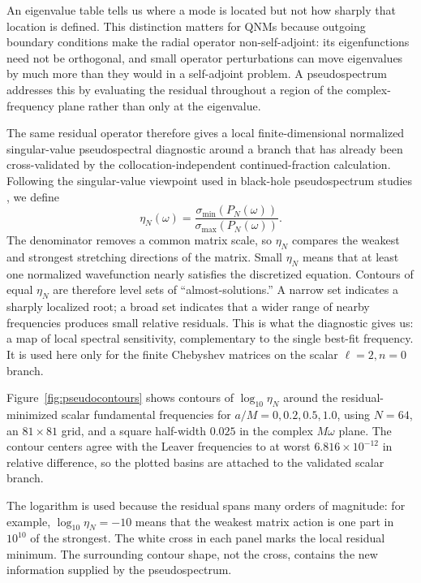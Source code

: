 \documentclass[12pt,a4paper]{article}
\begin{document}
\color{blue}
An eigenvalue table tells us where a mode is located but not how sharply that
location is defined.  This distinction matters for QNMs because outgoing
boundary conditions make the radial operator non-self-adjoint: its
eigenfunctions need not be orthogonal, and small operator perturbations can
move eigenvalues by much more than they would in a self-adjoint problem.  A
pseudospectrum addresses this by evaluating the residual throughout a region
of the complex-frequency plane rather than only at the eigenvalue.

The same residual operator therefore gives a local finite-dimensional
normalized singular-value pseudospectral diagnostic around a branch that has
already been cross-validated by the collocation-independent continued-fraction
calculation.  Following the
singular-value viewpoint used in black-hole pseudospectrum studies
\cite{Jaramillo2021,Cao2024}, we define
\color{black}
\begin{equation}
\eta_N(\omega)=\frac{\sigma_{\min}(P_N(\omega))}{\sigma_{\max}(P_N(\omega))}.
\end{equation}
\color{blue}
The denominator removes a common matrix scale, so \(\eta_N\) compares the
weakest and strongest stretching directions of the matrix.  Small
\(\eta_N\) means that at least one normalized wavefunction nearly satisfies
the discretized equation.  Contours of equal \(\eta_N\) are therefore level
sets of ``almost-solutions.''  A narrow set indicates a sharply localized
root; a broad set indicates that a wider range of nearby frequencies produces
small relative residuals.  This is what the diagnostic gives us: a map of
local spectral sensitivity, complementary to the single best-fit frequency.
It is used here only for the finite Chebyshev matrices on the scalar
\(\ell=2,n=0\) branch.
\color{black}

Figure~\ref{fig:pseudocontours} shows contours of \(\log_{10}\eta_N\) around the residual-minimized scalar fundamental frequencies for \(a/M=0,0.2,0.5,1.0\), using \(N=64\), an \(81\times81\) grid, and a square half-width \(0.025\) in the complex \(M\omega\) plane. The contour centers agree with the Leaver frequencies to at worst \(6.816\times10^{-12}\) in relative difference, so the plotted basins are attached to the validated scalar branch.

\color{blue}
The logarithm is used because the residual spans many orders of magnitude:
for example, \(\log_{10}\eta_N=-10\) means that the weakest matrix action is
one part in \(10^{10}\) of the strongest.  The white cross in each panel marks
the local residual minimum.  The surrounding contour shape, not the cross,
contains the new information supplied by the pseudospectrum.
\end{document}
